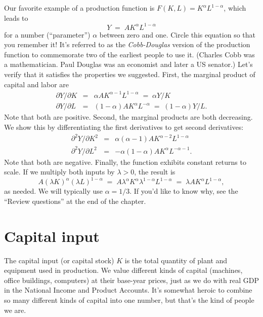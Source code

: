 Our favorite example of a production function is $F(K,L) = K^\alpha L^{1-\alpha}$, which leads to
\begin{equation}
    Y \;=\; A K^{\alpha} L^{1-\alpha}
    \label{eq:pf-cd}
\end{equation}
for a number (``parameter'') $\alpha$ between zero and one. Circle
this equation so that you remember it!  It's referred to as the {\it
  Cobb-Douglas\/} version of the production function to commemorate
two of the earliest people to use it.  (Charles Cobb was a
mathematician.  Paul Douglas was an economist and later a US
senator.) Let's verify that it satisfies the properties we
suggested. First, the marginal product of capital and labor are
\begin{eqnarray*}
    \partial Y /\partial K &=& \alpha A K^{\alpha-1}L^{1-\alpha} \;=\; \alpha {Y}/{K}\\
    \partial Y /\partial L &=& (1-\alpha) A K^{\alpha}L^{-\alpha} \;=\; (1-\alpha) {Y}/{L} .%
\end{eqnarray*}
Note that both are positive.
Second, the marginal products are both decreasing.
We show this by differentiating the first derivatives to get second derivatives:
\begin{eqnarray*}
    \partial^{2} Y / \partial K^{2} &=&  \alpha (\alpha-1) A K^{\alpha-2} L^{1-\alpha} \\
    \partial^{2} Y / \partial L^{2} &=& - \alpha(1-\alpha) A K^{\alpha}L^{-\alpha-1} .
\end{eqnarray*}
Note that both are negative.
%
Finally, the function exhibits constant returns to scale.
If we multiply both inputs by $\lambda > 0$, the result is
\[
    A (\lambda K)^{\alpha}(\lambda L)^{1-\alpha} \;=\; A\lambda^{\alpha} K^{\alpha} \lambda^{1-\alpha} L^{1-\alpha} \;=\; \lambda AK^{\alpha}L^{1-\alpha} ,%
\]
as needed.
We will typically use $\alpha = 1/3$.
If you'd like to know why, see the ``Review questions'' at the end of the chapter.


\section{Capital input}

The capital  input (or capital stock) $K$
is the total quantity of plant and equipment used in production.
We value different kinds of capital (machines, office buildings, computers)
at their base-year prices, just as we do with real GDP in the National Income and Product Accounts.
It's somewhat heroic to combine so many different kinds of capital into one
number, but that's the kind of people we are.

